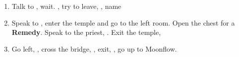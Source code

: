 \begin{enumerate}[resume]
  \item Talk to \auron, wait. \sd, try to leave, \sd, name \ixilon
  \item Speak to \auron, enter the temple and go to the left room. Open the chest for a \textbf{Remedy}. Speak to the priest, \sd. Exit the temple, \sd
  \item Go left, , cross the bridge, \sd, exit, \sd, go up to Moonflow.
\end{enumerate}
